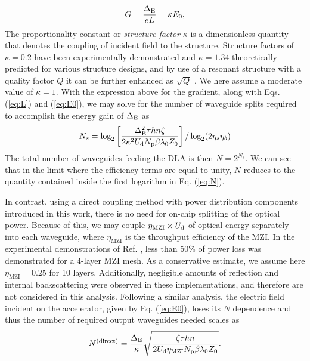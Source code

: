 \begin{equation}
    G = \frac{\Delta_\textrm{E}}{eL} = \kappa E_\textrm{0},
    \label{eq:G}
\end{equation}
%
The proportionality constant or \textit{structure factor} $\kappa$ is a dimensionless quantity that denotes the coupling of incident field to the structure. Structure factors of $\kappa = 0.2$ have been experimentally demonstrated \cite{cesar_optical_2018} and $\kappa = 1.34$ theoretically predicted \cite{bar2019design} for various structure designs, and by use of a resonant structure with a quality factor $Q$ it can be further enhanced as $\sqrt{Q}$ \cite{hughes_-chip_2018}. We here assume a moderate value of $\kappa = 1$. With the expression above for the gradient, along with Eqs. (\ref{eq:L}) and (\ref{eq:E0}), we may solve for the number of waveguide splits required to accomplish the energy gain of $\Delta_\textrm{E}$ as
\begin{equation}
    N_s = \log_2 \left[ \frac{\Delta_\textrm{E}^2 \tau h n \zeta}{2  \kappa^2 U_\textrm{d} N_\textrm{p} \beta \lambda_\textrm{0} Z_0} \right] / \log_2 (2 \eta_s \eta_b)
    \label{eq:N}
\end{equation}
The total number of waveguides feeding the DLA is then $N = 2^{N_s}$. We can see that in the limit where the efficiency terms are equal to unity, $N$ reduces to the quantity contained inside the first logarithm in Eq. (\ref{eq:N}).

In contrast, using a direct coupling method with power distribution components introduced in this work, there is no need for on-chip splitting of the optical power.  Because of this, we may couple $\eta_\textrm{MZI} \times U_\textrm{d}$ of optical energy separately into each waveguide, where $\eta_\textrm{MZI}$ is the throughput efficiency of the MZI. In the experimental demonstrations of Ref. \cite{annoni_unscrambling_2017,shen_deep_2017}, less than 50\% of power loss was demonstrated for a 4-layer MZI mesh. As a conservative estimate, we assume here $\eta_\textrm{MZI} = 0.25$ for 10 layers.  Additionally, negligible amounts of reflection and internal backscattering were observed in these implementations, and therefore are not considered in this analysis.  Following a similar analysis, the electric field incident on the accelerator, given by Eq. (\ref{eq:E0}), loses its $N$ dependence and thus the number of required output waveguides needed scales as 
\begin{equation}
    N^{(\textrm{direct})} =  \frac{\Delta_\textrm{E}}{\kappa} \sqrt{\frac{\zeta \tau h n}{2 U_\textrm{d} \eta_\textrm{MZI} N_\textrm{p} \beta \lambda_\textrm{0} Z_0 }}.
    \label{eq:N_direct}
\end{equation}

